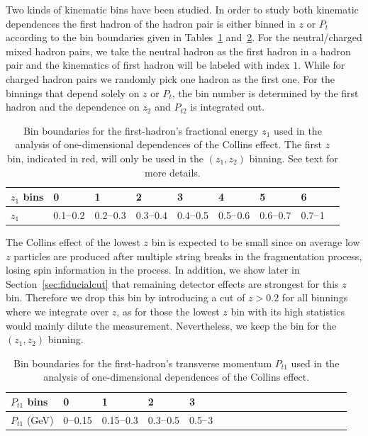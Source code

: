 Two kinds of kinematic bins have been studied. In order to study both kinematic dependences the first hadron of the hadron pair is either binned in $z$ or $P_t$ according to the bin boundaries given in Tables~\ref{tab:whatissinglez} and~\ref{tab:whatissinglept}. For the neutral/charged mixed hadron pairs, we take the neutral hadron as the first hadron in a hadron pair and the kinematics of first hadron will be labeled with index $1$. While for charged hadron pairs we randomly pick one hadron as the first one. For the binnings that depend solely on $z$ or $P_t$, the bin number is determined by the first hadron and the dependence on $z_2$ and $P_{t2}$ is integrated out. 
\begin{table}[H]\small
\centering
\begin{tabular}{|l|l|l|l|l|l|l|l|l|}
\hline
$z_1$ bins & 0 &  1 & 2 & 3 & 4 & 5 & 6  \\ \hline
 $z_1$  & {\color{red}0.1$\textup{--}$0.2} & 0.2$\textup{--}$0.3 & 0.3$\textup{--}$0.4 & 0.4$\textup{--}$0.5 & 0.5$\textup{--}$0.6 & 0.6$\textup{--}$0.7 & 0.7$\textup{--}$1  \\ \hline
\end{tabular}
\caption[Bin boundaries for $z_1$  in the analysis of 1d dependences]{Bin boundaries for the first-hadron's fractional energy $z_1$ used in the analysis of one-dimensional dependences of the Collins effect. The first $z$ bin, indicated in red, will only be used in the $(z_1,z_2)$  binning. See text for more details.}
\label{tab:whatissinglez}
\end{table}
The Collins effect of the lowest $z$ bin is expected to be small since on average low $z$ particles are produced after multiple string breaks in the fragmentation process, losing spin information in the process. In addition, we show later in Section~\ref{sec:fiducialcut} that remaining detector effects are strongest for this $z$ bin. Therefore we drop this bin by introducing a cut of $z>0.2$ for all binnings where we integrate over $z$, as for those the lowest $z$ bin with its high statistics would mainly dilute the measurement. Nevertheless, we keep the bin for the $(z_1,z_2)$ binning.


\begin{table}[H]\small
\centering
\begin{tabular}{|l|l|l|l|l|l|l|l|l|l|l|l|l|l|l|l|l|l|}
\hline
 $P_{t1}$ bins & 0 &  1 & 2 & 3   \\ \hline
 $P_{t1}$ (GeV)  & 0$\textup{--}$0.15& 0.15$\textup{--}$0.3 & 0.3$\textup{--}$0.5 & 0.5$\textup{--}$3  \\ \hline
\end{tabular}
\caption[Bin boundaries for  $P_{t1}$  in the analysis of 1d dependences]{Bin boundaries for the first-hadron's transverse momentum $P_{t1}$ used in the analysis of one-dimensional dependences of the Collins effect.}
\label{tab:whatissinglept}
\end{table}

